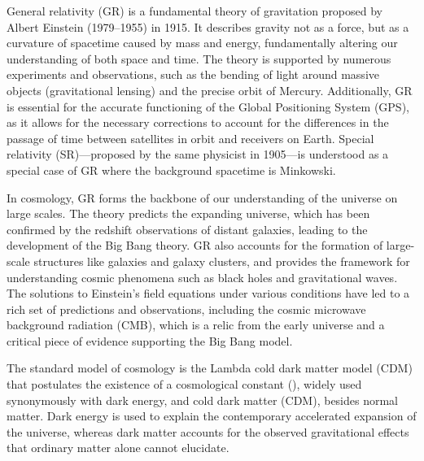 






General relativity (GR) is a fundamental theory of gravitation proposed by Albert Einstein (1979--1955) in 1915. It describes gravity not as a force, but as a curvature of spacetime caused by mass and energy, fundamentally altering our understanding of both space and time. The theory is supported by numerous experiments and observations, such as the bending of light around massive objects (gravitational lensing) and the precise orbit of Mercury. Additionally, GR is essential for the accurate functioning of the Global Positioning System (GPS), as it allows for the necessary corrections to account for the differences in the passage of time between satellites in orbit and receivers on Earth.
%
Special relativity (SR)---proposed by the same physicist in 1905---is understood as a special case of GR where the background spacetime is Minkowski. 
%


In cosmology, GR forms the backbone of our understanding of the universe on large scales. The theory predicts the expanding universe, which has been confirmed by the redshift observations of distant galaxies, leading to the development of the Big Bang theory. GR also accounts for the formation of large-scale structures like galaxies and galaxy clusters, and provides the framework for understanding cosmic phenomena such as black holes and gravitational waves. The solutions to Einstein's field equations under various conditions have led to a rich set of predictions and observations, including the cosmic microwave background radiation (CMB), which is a relic from the early universe and a critical piece of evidence supporting the Big Bang model.



The standard model of cosmology is the Lambda cold dark matter model (\textLambda{}CDM) that postulates the existence of a cosmological constant (\textLambda{}), widely used synonymously with dark energy, and cold dark matter (CDM), besides normal matter. Dark energy is used to explain the contemporary accelerated expansion of the universe, whereas dark matter accounts for the observed gravitational effects that ordinary matter alone cannot elucidate. %


